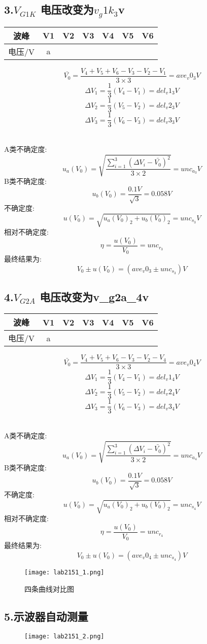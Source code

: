 \subsection*{3.$V_{G1K}$ 电压改变为${{v_g1k_3}}$v}
\begin{center}
\begin{tabular}{|c|c|c|c|c|c|c|}
	\hline
	波峰&V1&V2&V3&V4&V5&V6
	\\\hline
	电压/V
	{%
		&{{a}}
	{%
	\\\hline
	\end{tabular}
	\end{center}

$$  \bar{V_0}=\frac{V_4+V_5+V_6-V_3-V_2-V_1}{3\times 3}={{ave_v0_3}}V $$
$$	\Delta V_1=\frac{1}{3}(V_4-V_1)={{del_v1_3}}V $$
$$	\Delta V_2=\frac{1}{3}(V_5-V_2)={{del_v2_3}}V $$
$$	\Delta V_3=\frac{1}{3}(V_6-V_3)={{del_v3_3}}V $$ 

\ \\
A类不确定度:
$$	u_a(V_0)=\sqrt{\frac{\sum\limits_{i=1}^{3} (\Delta V_i-\bar{V_0})^2}{3\times 2}}={{ unc_a_3 }}V $$
B类不确定度:
$$	u_b(V_0)=\frac{0.1V}{\sqrt{3}}=0.058V $$
不确定度:
$$	u(V_0)=\sqrt{u_a(V_0)_2+u_b(V_0)_2}={{unc_s_3}}V $$
相对不确定度:
$$	\eta=\frac{u(V_0)}{V_0}={{unc_r_3}} $$
最终结果为:
$$	V_0 \pm u(V_0) = ({{ave_v0_3}} \pm {{ unc_s_3}})V $$


\subsection*{4.$V_{G2A}$ 电压改变为{{v_g2a_4}}v}
\begin{center}
\begin{tabular}{|c|c|c|c|c|c|c|}
	\hline
	波峰&V1&V2&V3&V4&V5&V6
	\\\hline
	电压/V
	{%
		&{{a}}
	{%
	\\\hline
	\end{tabular}
	\end{center}

$$  \bar{V_0}=\frac{V_4+V_5+V_6-V_3-V_2-V_4}{3\times 3}={{ave_v0_4}}V $$
$$	\Delta V_1=\frac{1}{3}(V_4-V_1)={{del_v1_4}}V $$
$$	\Delta V_2=\frac{1}{3}(V_5-V_2)={{del_v2_4}}V $$
$$	\Delta V_3=\frac{1}{3}(V_6-V_3)={{del_v3_4}}V $$ 

\ \\
A类不确定度:
$$	u_a(V_0)=\sqrt{\frac{\sum\limits_{i=1}^{3} (\Delta V_i-\bar{V_0})^2}{3\times 2}}={{ unc_a_4 }}V $$
B类不确定度:
$$	u_b(V_0)=\frac{0.1V}{\sqrt{3}}=0.058V $$
不确定度:
$$	u(V_0)=\sqrt{u_a(V_0)_2+u_b(V_0)_2}={{unc_s_4}}V $$
相对不确定度:
$$	\eta=\frac{u(V_0)}{V_0}={{unc_r_4}} $$
最终结果为:
$$	V_0 \pm u(V_0) = ({{ave_v0_4}} \pm {{ unc_s_4}})V $$


\begin{figure}[h]
	\centering
		\texttt{[image: lab2151\_1.png]}
    \caption{四条曲线对比图}
	\end{figure}

\subsection*{5.示波器自动测量}

\begin{figure}[h]
	\centering
		\texttt{[image: lab2151\_2.png]}
	\end{figure}